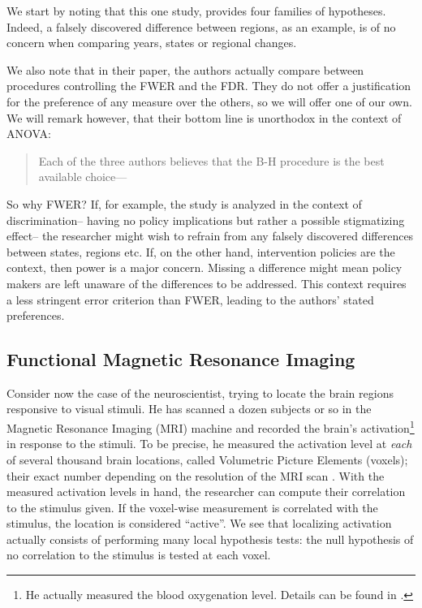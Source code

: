 \documentclass[review,12pt]{article}
\begin{document}
We start by noting that this one study, provides four families of hypotheses. Indeed, a falsely discovered difference between regions, as an example, is of no concern when comparing years, states or regional changes.

We also note that in their paper, the authors actually compare between procedures controlling the FWER and the FDR. They do not offer a justification for the preference of any measure over the others, so we will offer one of our own. We will remark however, that their bottom line is unorthodox in the context of ANOVA: 
\begin{quote}
Each of the three authors believes that the B-H procedure is the best available choice--- \citeauthor*{williams_controlling_1999}
\end{quote}

So why FWER? If, for example, the study is analyzed in the context of discrimination-- having no policy implications but rather a possible stigmatizing effect-- the researcher might wish to refrain from any falsely discovered differences between states, regions etc. If, on the other hand, intervention policies are the context, then power is a major concern. Missing a difference might mean policy makers are left unaware of the differences to be addressed. This context requires a less stringent error criterion than FWER, leading to the authors' stated preferences.





\subsection{\label{sub:fMRI}Functional Magnetic Resonance Imaging}

Consider now the case of the neuroscientist, trying to locate the brain regions responsive to visual stimuli. He has scanned a dozen subjects or so in the Magnetic Resonance Imaging (MRI) machine and recorded the brain's activation\footnote{ He actually measured the blood oxygenation level. Details can be found in \cite{lazar_statistical_2008}.} in response to the stimuli. To be precise, he measured the activation level at \emph{each} of several thousand brain locations, called Volumetric Picture Elements (voxels); their exact number depending on the resolution of the MRI scan . With the measured activation levels in hand, the researcher can compute their correlation to the stimulus given. If the voxel-wise measurement is correlated with the stimulus, the location is considered ``active''. We see that localizing activation actually consists of performing many local hypothesis tests: the null hypothesis of no correlation to the stimulus is tested at each voxel.
\end{document}

